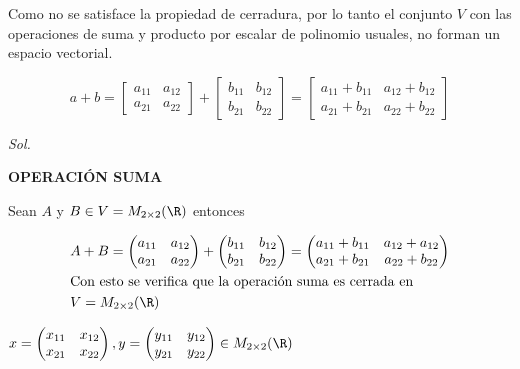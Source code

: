 Como no se satisface la propiedad de cerradura, por lo tanto el conjunto $V$ con las operaciones de suma y producto
por escalar de polinomio usuales, no forman un espacio vectorial.


\begin{problem}
\begin{equation}
	a+b=\begin{bmatrix}a_{11}&a_{12}\\a_{21}&a_{22}\end{bmatrix}+\begin{bmatrix}b_{11}&b_{12}\\b_{21}&b_{22}\end{bmatrix}=\begin{bmatrix}a_{11}+b_{11}&a_{12}+b_{12}\\a_{21}+b_{21}&a_{22}+b_{22}\end{bmatrix}
\end{equation}
\end{problem}

\textit{ Sol. }

\textbf{OPERACIÓN SUMA}

\begin{exercise}
	Sean $A$ y $B\in V=M_{2\times 2}(\R)$ entonces
\end{exercise}

\begin{align*}
	 & A+B=\begin{pmatrix}
		       a_{11} & a_{12} \\a_{21}&a_{22}
	       \end{pmatrix}+\begin{pmatrix}
		                     b_{11} & b_{12} \\b_{21}&b_{22}
	                     \end{pmatrix}=\begin{pmatrix}
		                                   a_{11}+b_{11} & a_{12}+a_{12} \\a_{21}+b_{21}&a_{22}+b_{22}
	                                   \end{pmatrix} \\
	 & \text{Con esto se verifica que la operación suma es cerrada en }                           \\
	 & V=M_{2\times 2}(\R)
\end{align*}

\begin{exercise}[Verifique que $x+y=y+x$, Sean]

	$x=\begin{pmatrix}
			x_{11} & x_{12} \\x_{21}&x_{22}
		\end{pmatrix},y=\begin{pmatrix}y_{11} & y_{12} \\y_{21}&y_{22}
		\end{pmatrix}\in M_{2\times 2}(\R)$
\end{exercise}

